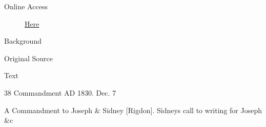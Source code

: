 			\begin{description}
				\item[Online Access] \href{https://www.josephsmithpapers.org/paper-summary/revelation-7-december-1830-dc-35/1}{Here}
			\end{description}
			
			\begin{description}
				\item[Background]
			\end{description}
			
			
			\begin{description}
				\item[Original Source]
			\end{description}
			
			
			\begin{description}
				\item[Text]
			\end{description}
			
				\begin{tightcenter}
				38 Commandment AD 1830. Dec. 7
				\end{tightcenter}
				
				A Commandment to Joseph \& Sidney [Rigdon]. Sidneys call to writing for Joseph \&c
				
